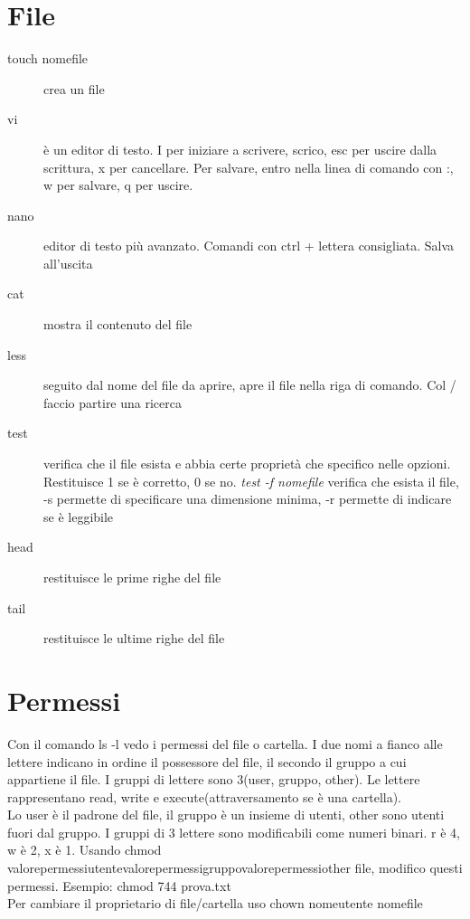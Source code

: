 \section{File}
\begin{description}
\item [touch nomefile] crea un file	\\
\item [vi] è un editor di testo. I per iniziare a scrivere, scrico, esc per uscire dalla scrittura, x per cancellare. Per salvare, entro nella linea di comando con :, w per salvare, q per uscire.\\
\item [nano] editor di testo più avanzato. Comandi con ctrl + lettera consigliata. Salva all'uscita
\item [cat] mostra il contenuto del file\\
\item [less] seguito dal nome del file da aprire, apre il file nella riga di comando. Col / faccio partire una ricerca\\
\item [test] verifica che il file esista e abbia certe proprietà che specifico nelle opzioni. Restituisce 1 se è corretto, 0 se no. 
\textit{test -f nomefile} verifica che esista il file, -s permette di specificare una dimensione minima, -r permette di indicare se è leggibile
\item [head] restituisce le prime righe del file
\item[tail] restituisce le ultime righe del file
\end{description}

\section{Permessi}
Con il comando ls -l vedo i permessi del file o cartella. I due nomi a fianco alle lettere indicano in ordine il possessore del file, il secondo il gruppo a cui appartiene il file.
I gruppi di lettere sono 3(user, gruppo, other). Le lettere rappresentano read, write e execute(attraversamento se è una cartella).\\
Lo user è il padrone del file, il gruppo è un insieme di utenti, other sono utenti fuori dal gruppo. I gruppi di 3 lettere sono modificabili come numeri binari. r è 4, w è 2, x è 1. Usando chmod valorepermessiutentevalorepermessigruppovalorepermessiother file, modifico questi permessi. Esempio: chmod 744 prova.txt\\
Per cambiare il proprietario di file/cartella uso chown nomeutente nomefile


